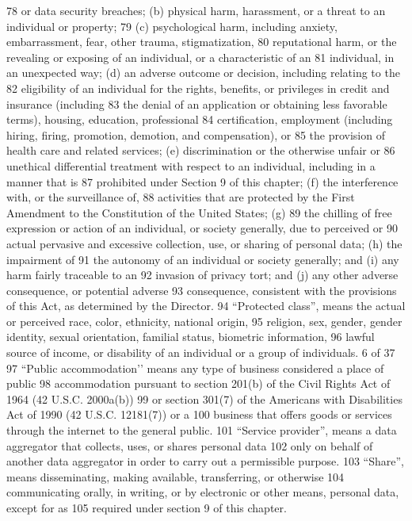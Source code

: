 78 or data security breaches; (b) physical harm, harassment, or a threat to an individual or property;
79 (c) psychological harm, including anxiety, embarrassment, fear, other trauma, stigmatization,
80 reputational harm, or the revealing or exposing of an individual, or a characteristic of an
81 individual, in an unexpected way; (d) an adverse outcome or decision, including relating to the
82 eligibility of an individual for the rights, benefits, or privileges in credit and insurance (including
83 the denial of an application or obtaining less favorable terms), housing, education, professional
84 certification, employment (including hiring, firing, promotion, demotion, and compensation), or
85 the provision of health care and related services; (e) discrimination or the otherwise unfair or
86 unethical differential treatment with respect to an individual, including in a manner that is
87 prohibited under Section 9 of this chapter; (f) the interference with, or the surveillance of,
88 activities that are protected by the First Amendment to the Constitution of the United States; (g)
89 the chilling of free expression or action of an individual, or society generally, due to perceived or
90 actual pervasive and excessive collection, use, or sharing of personal data; (h) the impairment of
91 the autonomy of an individual or society generally; and (i) any harm fairly traceable to an
92 invasion of privacy tort; and (j) any other adverse consequence, or potential adverse
93 consequence, consistent with the provisions of this Act, as determined by the Director.
94 “Protected class”, means the actual or perceived race, color, ethnicity, national origin,
95 religion, sex, gender, gender identity, sexual orientation, familial status, biometric information,
96 lawful source of income, or disability of an individual or a group of individuals.
6 of 37
97 “Public accommodation’’ means any type of business considered a place of public
98 accommodation pursuant to section 201(b) of the Civil Rights Act of 1964 (42 U.S.C. 2000a(b))
99 or section 301(7) of the Americans with Disabilities Act of 1990 (42 U.S.C. 12181(7)) or a
100 business that offers goods or services through the internet to the general public.
101 “Service provider”, means a data aggregator that collects, uses, or shares personal data
102 only on behalf of another data aggregator in order to carry out a permissible purpose.
103 “Share”, means disseminating, making available, transferring, or otherwise
104 communicating orally, in writing, or by electronic or other means, personal data, except for as
105 required under section 9 of this chapter.
